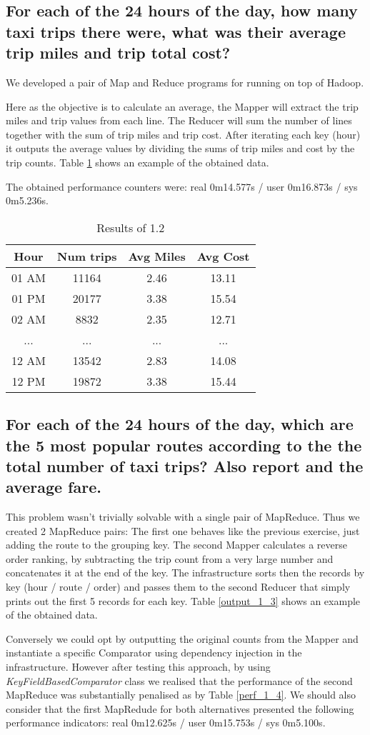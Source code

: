 \documentclass[conference,compsoc]{IEEEtran}
\begin{document}
\subsection{For each of the 24 hours of the day, how many taxi trips there were, what was their average trip miles and trip total cost?}
We developed a pair of Map and Reduce programs for running on top of Hadoop. \par Here as the objective is to calculate an average, the Mapper will extract the trip miles and trip values from each line. The Reducer will sum the number of lines together with the sum of trip miles and trip cost. After iterating each key (hour) it outputs the average values by dividing the sums of trip miles and cost by the trip counts. Table \ref{output_1_2} shows an example of the obtained data. \par The obtained performance counters were: real	0m14.577s / user 0m16.873s / sys 0m5.236s.
\begin{table}[!t]
\renewcommand{\arraystretch}{1.3}
\caption{Results of 1.2}
\label{output_1_2}
\centering
\begin{tabular}{c||c|c|c}
\hline
\bfseries Hour & \bfseries Num trips & \bfseries Avg Miles & \bfseries Avg Cost\\
\hline\hline
01 AM&11164&2.46&13.11\\
01 PM&20177&3.38&15.54\\
02 AM&8832&2.35&12.71\\
...&...&...&...\\
12 AM&13542&2.83&14.08\\
12 PM&19872&3.38&15.44\\
\hline
\end{tabular}
\end{table}

\subsection{For each of the 24 hours of the day, which are the 5 most popular routes according to the the total number of taxi trips? Also report and the average fare.}
This problem wasn't trivially solvable with a single pair of MapReduce. Thus we created 2 MapReduce pairs: The first one behaves like the previous exercise, just adding the route to the grouping key. The second Mapper calculates a reverse order ranking, by subtracting the trip count from a very large number and concatenates it at the end of the key. The infrastructure sorts then the records by key (hour / route / order) and passes them to the second Reducer that simply prints out the first 5 records for each key. Table \ref{output_1_3} shows an example of the obtained data. \par Conversely we could opt by outputting the original counts from the Mapper and instantiate a specific Comparator using dependency injection in the infrastructure. However after testing this approach, by using \textit{KeyFieldBasedComparator} class we realised that the performance of the second MapReduce was substantially penalised as by Table \ref{perf_1_4}. We should also consider that the first MapRedude for both alternatives presented the following performance indicators: real 0m12.625s / user 0m15.753s / sys 0m5.100s.
\end{document}
